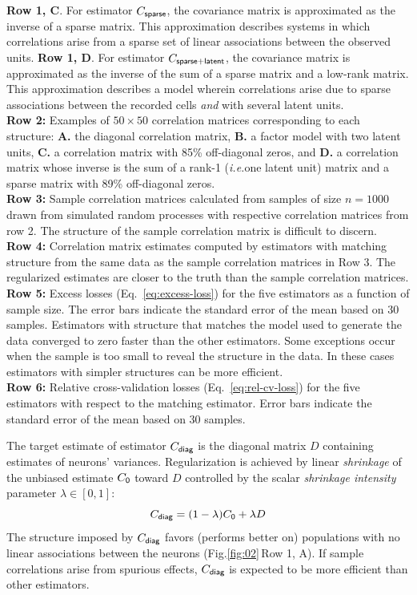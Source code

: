 \documentclass[10pt]{article}
\newcommand{\figref}[2]{Fig.\;\ref{fig:#1}\,#2}
\newcommand{\ie}{\emph{i.e.}\;}
\begin{document}
\begin{FPfigure}
{        {\bf  Row 1, C}. For estimator $C_{\sf sparse}$, the covariance matrix is approximated as the inverse of a sparse matrix. This approximation describes systems in which correlations arise from a sparse set of  linear associations between the observed units. 
        {\bf  Row 1, D}.  For estimator $C_{\sf sparse+latent}$, the covariance matrix is approximated as the inverse of the sum of a sparse matrix and a low-rank matrix. This approximation describes a model wherein correlations arise due to sparse associations between the recorded cells \emph{and} with several latent units. \\
{\bf Row 2:} Examples of $50\times 50$ correlation matrices corresponding to each structure: {\bf A.} the diagonal correlation matrix, {\bf B.} a factor model with two latent units, {\bf C.}  a correlation matrix with 85\%  off-diagonal zeros, and {\bf  D.} a correlation matrix whose inverse is the sum of a rank-1 (\ie one latent unit) matrix and a sparse matrix with 89\% off-diagonal zeros. 
\\
{\bf Row 3:} Sample correlation matrices calculated from samples of size $n=1000$ drawn from simulated random processes with respective correlation matrices from row 2.  The structure of the sample correlation matrix is difficult to discern.
\\
{\bf Row 4:} Correlation matrix estimates computed by estimators with matching structure from the same data as the sample correlation matrices in Row 3. The regularized estimates are closer to the truth than the sample correlation matrices.
\\
{\bf Row 5:} Excess losses (Eq.~\ref{eq:excess-loss}) for the five estimators as a function of sample size. The error bars indicate the standard error of the mean based on 30 samples.  Estimators with structure that matches the model used to generate the data converged to zero faster than the other estimators. Some exceptions occur when the sample is too small to reveal the structure in the data. In these cases estimators with simpler structures can be more efficient.
\\
{\bf Row 6:} Relative cross-validation losses (Eq.~\ref{eq:rel-cv-loss}) for the five estimators with respect to the matching estimator. Error bars indicate the standard error of the mean based on 30 samples.
    }
    \label{fig:02}
\end{FPfigure} 

The target estimate of estimator $C_{\sf diag}$ is the diagonal matrix $D$ containing estimates of neurons' variances. Regularization is achieved by linear \emph{shrinkage} of the unbiased estimate $C_{\sf 0}$ toward $D$ controlled by the scalar \emph{shrinkage intensity} parameter $\lambda \in [0, 1]$:
\begin{equation}\label{eq:c-diag}
C_{\sf diag} = (1-\lambda) C_{\sf 0} + \lambda D
\end{equation}
The structure imposed by $C_{\sf diag}$ favors (performs better  on) populations   with no linear associations between the neurons (\figref{02}{Row 1, A}).  If sample correlations arise from spurious effects, $C_{\sf diag}$ is expected to be more efficient than other estimators. 
\end{document}
